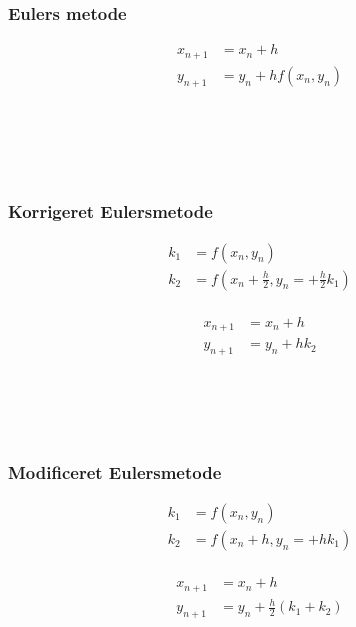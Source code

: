 
\begin{frame}
\frametitle{Eulers metode } 
\begin{minipage}[b]{0.31\textwidth}
\begin{align*}
x_{n+1} & = x_n+h \\
y_{n+1} & = y_n + h f(x_n,y_n) \\
\phantom{x_1}\\
\\
\\
\end{align*}
\end{minipage}
\phantom{hejmeddig}
%

\\
\phantom{H}
\\
%
\end{frame}
%
%
%
%
\begin{frame}
\frametitle{Korrigeret Eulersmetode } 
\begin{minipage}[b]{0.31\textwidth}
\begin{align*}
k_1 & = f(x_n , y_n) \\
k_2 & = f \left( x_n + \frac{h}{2} , y_n = + \frac{h}{2} k_1 \right)  \\
\end{align*}
\end{minipage} 
\phantom{Hej}
\begin{minipage}[t]{0.31\textwidth}
\begin{align*}
x_{n+1} & = x_n+h \\
y_{n+1} & = y_n + h k_2 \\
\end{align*}
\end{minipage} 
\\
%

\\
\phantom{H}
\\
%
\end{frame}
%
%
%
\begin{frame}
\frametitle{Modificeret Eulersmetode}  
\begin{minipage}[t]{0.31\textwidth}
\begin{align*}
k_1 & = f(x_n , y_n) \\
k_2 & = f( x_n + h , y_n = + h k_1 ) \\
\end{align*}
%
\end{minipage} 
\phantom{Hej}
\begin{minipage}[t]{0.31\textwidth}
\begin{align*}
x_{n+1} & = x_n+h \\
y_{n+1} & = y_n + \frac{h}{2} (k_1 + k_2 ) \\
\end{align*}
%
\end{minipage} 
\\

\\
\phantom{H}
\\
%
\end{frame}
